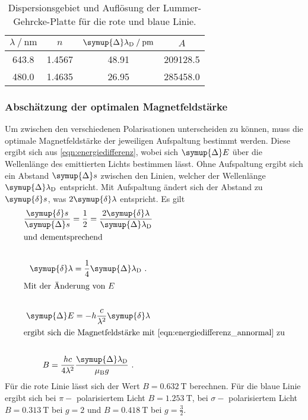     \begin{table}
        \centering
        \caption{Dispersionsgebiet und Auflösung der Lummer-Gehrcke-Platte für die rote und blaue Linie.}
        \label{tab:vorb_sechs}
        \begin{tabular}{c c c c}
            \toprule
            {$\lambda \mathbin{/} \si{\nano\meter}$} & {$n$} & {$\symup{\Delta}\lambda_\text{D} \mathbin{/} \si{\pico\meter}$} & {$A$} \\
            \midrule
            643.8 & 1.4567 & 48.91 & 209128.5 \\ %
            480.0 & 1.4635 & 26.95 & 285458.0 \\
            \bottomrule
        \end{tabular}
    \end{table}

\subsubsection{Abschätzung der optimalen Magnetfeldstärke}
\label{sec:vorb_magnetfeldstaerke}

    Um zwischen den verschiedenen Polarisationen unterscheiden zu können,
    muss die optimale Magnetfeldstärke der jeweiligen Aufspaltung bestimmt werden.
    Diese ergibt sich aus \autoref{eqn:energiedifferenz},
    wobei sich $\symup{\Delta} E$ über die Wellenlänge des emittierten Lichts bestimmen lässt.
    Ohne Aufspaltung ergibt sich ein Abstand $\symup{\Delta} s$ zwischen den Linien,
    welcher der Wellenlänge $\symup{\Delta} \lambda_\text{D}$ entspricht.
    Mit Aufspaltung ändert sich der Abstand zu $\symup{\delta} s$,
    was $2 \symup{\delta} \lambda$ entspricht.
    Es gilt
    \begin{gather*}
        \frac{\symup{\delta} s}{\symup{\Delta} s} = \frac{1}{2} = \frac{2 \symup{\delta} \lambda}{\symup{\Delta} \lambda_\text{D}} \\
        \intertext{und dementsprechend} \\
        \symup{\delta} \lambda = \frac{1}{4} \symup{\Delta} \lambda_\text{D} \ . \\
        \intertext{Mit der Änderung von $E$} \\
        \symup{\Delta} E = - h \frac{c}{\lambda^2} \symup{\delta} \lambda \\
        \intertext{ergibt sich die Magnetfeldstärke mit \autoref{eqn:energiedifferenz_annormal} zu} \\
        B = \frac{h c}{4 \lambda^2} \frac{\symup{\Delta} \lambda_\text{D}}{\mu_\text{B} g} \ .
    \end{gather*}
    Für die rote Linie lässt sich der Wert $B = \SI{0.632}{\tesla}$ berechnen.
    Für die blaue Linie ergibt sich bei $\pi-$ polarisiertem Licht $B = \SI{1.253}{\tesla}$,
    bei $\sigma-$ polarisiertem Licht $B = \SI{0.313}{\tesla}$ bei $g=2$ und $B = \SI{0.418}{\tesla}$ bei $g=\frac{3}{2}$.




